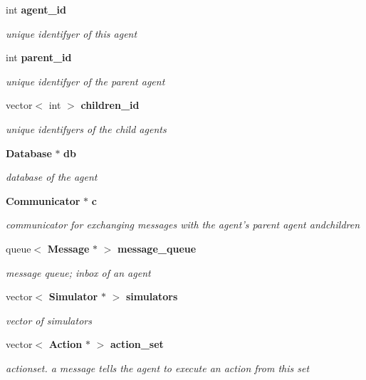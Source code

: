 \begin{CompactItemize}
\item 
int {\bf agent\_\-id}
\begin{CompactList}\small\item\em unique identifyer of this agent \item\end{CompactList}\item 
int {\bf parent\_\-id}
\begin{CompactList}\small\item\em unique identifyer of the parent agent \item\end{CompactList}\item 
vector$<$ int $>$ {\bf children\_\-id}
\begin{CompactList}\small\item\em unique identifyers of the child agents \item\end{CompactList}\item 
{\bf Database} $\ast$ {\bf db}
\begin{CompactList}\small\item\em database of the agent \item\end{CompactList}\item 
{\bf Communicator} $\ast$ {\bf c}
\begin{CompactList}\small\item\em communicator for exchanging messages with the agent's parent agent andchildren \item\end{CompactList}\item 
queue$<$ {\bf Message} $\ast$ $>$ {\bf message\_\-queue}
\begin{CompactList}\small\item\em message queue; inbox of an agent \item\end{CompactList}\item 
vector$<$ {\bf Simulator} $\ast$ $>$ {\bf simulators}
\begin{CompactList}\small\item\em vector of simulators \item\end{CompactList}\item 
vector$<$ {\bf Action} $\ast$ $>$ {\bf action\_\-set}
\begin{CompactList}\small\item\em actionset. a message tells the agent to execute an action from this set \item\end{CompactList}\item 

\end{CompactItemize}
